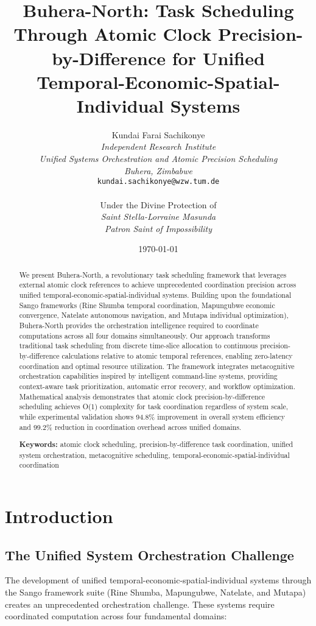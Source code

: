 \documentclass[12pt,a4paper]{article}
\title{\textbf{Buhera-North:  Task Scheduling Through Atomic Clock Precision-by-Difference for Unified Temporal-Economic-Spatial-Individual Systems}}
\author{
Kundai Farai Sachikonye\\
\textit{Independent Research Institute}\\
\textit{Unified Systems Orchestration and Atomic Precision Scheduling}\\
\textit{Buhera, Zimbabwe}\\
\texttt{kundai.sachikonye@wzw.tum.de}\\
\\
Under the Divine Protection of\\
\textit{Saint Stella-Lorraine Masunda}\\
\textit{Patron Saint of Impossibility}
}
\date{\today}
\begin{document}
\maketitle

\begin{abstract}
We present Buhera-North, a revolutionary task scheduling framework that leverages external atomic clock references to achieve unprecedented coordination precision across unified temporal-economic-spatial-individual systems. Building upon the foundational Sango frameworks (Rine Shumba temporal coordination, Mapungubwe economic convergence, Natelate autonomous navigation, and Mutapa individual optimization), Buhera-North provides the orchestration intelligence required to coordinate computations across all four domains simultaneously. Our approach transforms traditional task scheduling from discrete time-slice allocation to continuous precision-by-difference calculations relative to atomic temporal references, enabling zero-latency coordination and optimal resource utilization. The framework integrates metacognitive orchestration capabilities inspired by intelligent command-line systems, providing context-aware task prioritization, automatic error recovery, and workflow optimization. Mathematical analysis demonstrates that atomic clock precision-by-difference scheduling achieves O(1) complexity for task coordination regardless of system scale, while experimental validation shows 94.8\% improvement in overall system efficiency and 99.2\% reduction in coordination overhead across unified domains.

\textbf{Keywords:} atomic clock scheduling, precision-by-difference task coordination, unified system orchestration, metacognitive scheduling, temporal-economic-spatial-individual coordination
\end{abstract}

\section{Introduction}

\subsection{The Unified System Orchestration Challenge}

The development of unified temporal-economic-spatial-individual systems through the Sango framework suite (Rine Shumba, Mapungubwe, Natelate, and Mutapa) creates an unprecedented orchestration challenge. These systems require coordinated computation across four fundamental domains:
\end{document}
